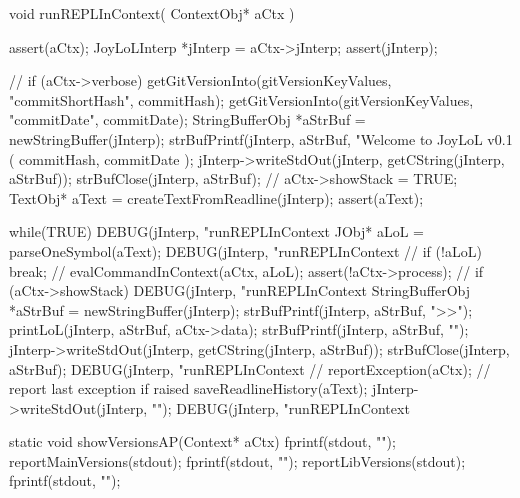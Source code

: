 \startCCode
void runREPLInContext(
  ContextObj* aCtx
) {
  assert(aCtx);
  JoyLoLInterp *jInterp = aCtx->jInterp;
  assert(jInterp);
  
//  if (aCtx->verbose) {
    getGitVersionInto(gitVersionKeyValues, "commitShortHash", commitHash);
    getGitVersionInto(gitVersionKeyValues, "commitDate",      commitDate);
    StringBufferObj *aStrBuf = newStringBuffer(jInterp);
    strBufPrintf(jInterp, aStrBuf, "Welcome to JoyLoL v0.1 ( %
      commitHash,
      commitDate
    );
    jInterp->writeStdOut(jInterp, getCString(jInterp, aStrBuf));
    strBufClose(jInterp, aStrBuf);
//  }
  aCtx->showStack = TRUE;
  TextObj* aText = createTextFromReadline(jInterp);
  assert(aText);
  
  while(TRUE) {
    DEBUG(jInterp, "runREPLInContext %
    JObj* aLoL = parseOneSymbol(aText);
    DEBUG(jInterp, "runREPLInContext %
    //
    if (!aLoL) break;
    //
    evalCommandInContext(aCtx, aLoL);
    assert(!aCtx->process);
    //
    if (aCtx->showStack) {
      DEBUG(jInterp, "runREPLInContext %
      StringBufferObj *aStrBuf = newStringBuffer(jInterp);
      strBufPrintf(jInterp, aStrBuf, ">>");
      printLoL(jInterp, aStrBuf, aCtx->data);
      strBufPrintf(jInterp, aStrBuf, "\n");
      jInterp->writeStdOut(jInterp, getCString(jInterp, aStrBuf));
      strBufClose(jInterp, aStrBuf);
      DEBUG(jInterp, "runREPLInContext %
    }
    //
    reportException(aCtx); // report last exception if raised
  }
  saveReadlineHistory(aText);
  jInterp->writeStdOut(jInterp, "\n");
  DEBUG(jInterp, "runREPLInContext %
}
\stopCCode

\starttyping
static void showVersionsAP(Context* aCtx) {
  fprintf(stdout, "\n");
  reportMainVersions(stdout);
  fprintf(stdout, "\n");
  reportLibVersions(stdout);
  fprintf(stdout, "\n");
}
\stoptyping